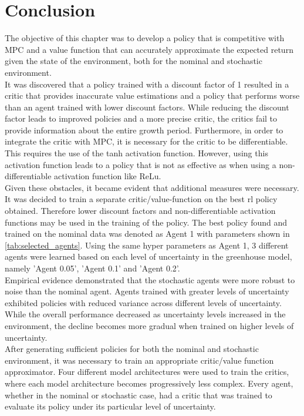 \section{Conclusion}
The objective of this chapter was to develop a policy that is competitive with MPC and a value function that can accurately approximate the expected return given the state of the environment, both for the nominal and stochastic environment. \\
It was discovered that a policy trained with a discount factor of 1 resulted in a critic that provides inaccurate value estimations and a policy that performs worse than an agent trained with lower discount factors. While reducing the discount factor leads to improved policies and a more precise critic, the critics fail to provide information about the entire growth period. Furthermore, in order to integrate the critic with MPC, it is necessary for the critic to be differentiable. This requires the use of the tanh activation function. However, using this activation function leads to a policy that is not as effective as when using a non-differentiable activation function like ReLu. \\
Given these obstacles, it became evident that additional measures were necessary. It was decided to train a separate critic/value-function on the best rl policy obtained. Therefore lower discount factors and non-differentiable activation functions may be used in the training of the policy. The best policy found and trained on the nominal data was denoted as Agent 1 with parameters shown in \autoref{tab:selected_agents}. Using the same hyper parameters as Agent 1, 3 different agents were learned based on each level of uncertainty in the greenhouse model, namely 'Agent 0.05', 'Agent 0.1' and 'Agent 0.2'. \\
Empirical evidence demonstrated that the stochastic agents were more robust to noise than the nominal agent. Agents trained with greater levels of uncertainty exhibited policies with reduced variance across different levels of uncertainty. While the overall performance decreased as uncertainty levels increased in the environment, the decline becomes more gradual when trained on higher levels of uncertainty.\\
After generating sufficient policies for both the nominal and stochastic environment, it was necessary to train an appropriate critic/value function approximator. Four different model architectures were used to train the critics, where each model architecture becomes progressively less complex. Every agent, whether in the nominal or stochastic case, had a critic that was trained to evaluate its policy under its particular level of uncertainty.\\
